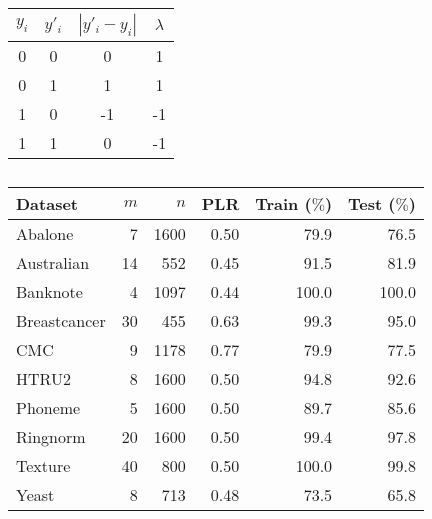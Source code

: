 \begin{table}
    \footnotesize
    \centering
    \caption{}
    \begin{tabular}{c|c|c|c}
        \toprule
        $y_i$ & $y'_i$ & $|y'_i-y_i|$ & $\lambda$ \\
        \midrule
        0 & 0 & 0 & 1 \\
        0 & 1 & 1 & 1 \\
        1 & 0 & -1 & -1 \\
        1 & 1 & 0 & -1 \\
        \bottomrule
    \end{tabular}
    \label{table.y}
\end{table}

\begin{table}
    \footnotesize
    \centering
    \caption{}
    \begin{tabular}{l|r|r|r|r|r}
        \toprule
        Dataset         & $m$ & $n$ & PLR  & Train ($\%$) & Test ($\%$) \\
        \midrule
        Abalone      & 7  & 1600 & 0.50 &  79.9 &  76.5 \\
        Australian   & 14 & 552  & 0.45 &  91.5 &  81.9 \\
        Banknote     & 4  & 1097 & 0.44 & 100.0 & 100.0 \\
        Breastcancer & 30 & 455  & 0.63 &  99.3 &  95.0 \\
        CMC          & 9  & 1178 & 0.77 &  79.9 &  77.5 \\
        HTRU2        & 8  & 1600 & 0.50 &  94.8 &  92.6 \\
        Phoneme      & 5  & 1600 & 0.50 &  89.7 &  85.6 \\
        Ringnorm     & 20 & 1600 & 0.50 &  99.4 &  97.8 \\
        Texture      & 40 & 800  & 0.50 & 100.0 &  99.8 \\
        Yeast        & 8  & 713  & 0.48 &  73.5 &  65.8 \\
        \bottomrule
    \end{tabular}
    \label{tab.datasets}
\end{table}

